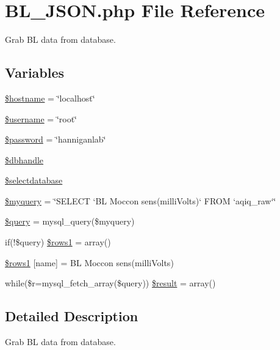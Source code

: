 \hypertarget{_b_l___j_s_o_n_8php}{}\section{B\+L\+\_\+\+J\+S\+O\+N.\+php File Reference}
\label{_b_l___j_s_o_n_8php}


Grab BL data from database.  


\subsection*{Variables}
\begin{DoxyCompactItemize}
\item 
\hyperlink{_b_l___j_s_o_n_8php_a8bf9ffb42ed554b203b55377d1fc9aa4}{\$hostname} = \char`\"{}localhost\char`\"{}
\item 
\hyperlink{_b_l___j_s_o_n_8php_a0eb82aa5f81cf845de4b36cd653c42cf}{\$username} = \char`\"{}root\char`\"{}
\item 
\hyperlink{_b_l___j_s_o_n_8php_a607686ef9f99ea7c42f4f3dd3dbb2b0d}{\$password} = \char`\"{}hanniganlab\char`\"{}
\item 
\hyperlink{_b_l___j_s_o_n_8php_a013f690a9cf598d1498e72aa8aa8a8d2}{\$dbhandle}
\item 
\hyperlink{_b_l___j_s_o_n_8php_a3a00cb9dd022e8ab0cdfe17aad984a14}{\$selectdatabase}
\item 
\hyperlink{_b_l___j_s_o_n_8php_a8ff37acfddb2efb7962bb94d1c6d0d1c}{\$myquery} = \char`\"{}S\+E\+L\+E\+CT `BL Moccon sens(milli\+Volts)` F\+R\+OM `aqiq\+\_\+raw`\char`\"{}
\item 
\hyperlink{_b_l___j_s_o_n_8php_af59a5f7cd609e592c41dc3643efd3c98}{\$query} = mysql\+\_\+query(\$myquery)
\item 
if(!\$query) \hyperlink{_b_l___j_s_o_n_8php_a15da33e0f4006a60bff01708cb5d1428}{\$rows1} = array()
\item 
\hyperlink{_b_l___j_s_o_n_8php_aece741d5099bb229e07df7a57776cfaa}{\$rows1} \mbox{[}\textquotesingle{}name\textquotesingle{}\mbox{]} = \textquotesingle{}BL Moccon sens(milli\+Volts)\textquotesingle{}
\item 
while(\$r=mysql\+\_\+fetch\+\_\+array(\$query)) \hyperlink{_b_l___j_s_o_n_8php_a9148136d1e11f768be4f805d7e567da2}{\$result} = array()
\end{DoxyCompactItemize}


\subsection{Detailed Description}
Grab BL data from database. 

